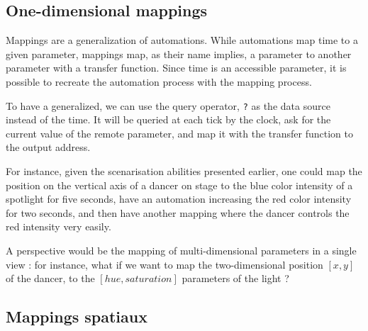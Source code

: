\documentclass{sigchi}
\begin{document}
\subsection{One-dimensional mappings}
Mappings are a generalization of automations. While automations map time to a given parameter, mappings map, as their name implies, a parameter to another parameter with a transfer function. Since time is an accessible parameter, it is possible to recreate the automation process with the mapping process.

To have a generalized, we can use the query operator, \texttt{?} as the data source instead of the time. It will be queried at each tick by the clock, ask for the current value of the remote parameter, and map it with the transfer function to the output address.

For instance, given the scenarisation abilities presented earlier, one could map the position on the vertical axis of a dancer on stage to the blue color intensity of a spotlight for five seconds, have an automation increasing the red color intensity for  two seconds, and then have another mapping where the dancer controls the red intensity very easily.

A perspective would be the mapping of multi-dimensional parameters in a single view : for instance, what if we want to map the two-dimensional position $[x, y]$ of the dancer, to the $[hue, saturation]$ parameters of the light ?

\subsection{Mappings spatiaux}




    
\end{document}
